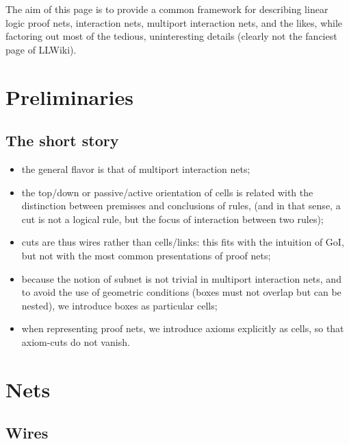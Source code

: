 
The aim of this page is to provide a common framework for describing
linear logic proof nets, interaction nets, multiport interaction nets,
and the likes, while factoring out most of the tedious, uninteresting
details (clearly not the fanciest page of LLWiki).

\section{Preliminaries}\label{preliminaries}

\subsection{The short story}\label{the-short-story}

\begin{itemize}
\item
  the general flavor is that of multiport interaction nets;
\item
  the top/down or passive/active orientation of cells is related with
  the distinction between premisses and conclusions of rules, (and in
  that sense, a cut is not a logical rule, but the focus of interaction
  between two rules);
\item
  cuts are thus wires rather than cells/links: this fits with the
  intuition of GoI, but not with the most common presentations of proof
  nets;
\item
  because the notion of subnet is not trivial in multiport interaction
  nets, and to avoid the use of geometric conditions (boxes must not
  overlap but can be nested), we introduce boxes as particular cells;
\item
  when representing proof nets, we introduce axioms explicitly as cells,
  so that axiom-cuts do not vanish.
\end{itemize}

\section{Nets}\label{nets}

\subsection{Wires}\label{wires}

